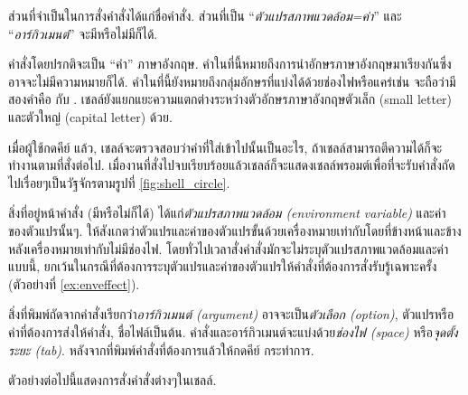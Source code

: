 \begin{thwbr}

ส่วนที่จำเป็นในการสั่งคำสั่งได้แก่ชื่อคำสั่ง. ส่วนที่เป็น ``\textit{ตัวแปรสภาพแวดล้อม=ค่า}'' และ ``\textit{อาร์กิวเมนต์}'' จะมีหรือไม่มีก็ได้. 

คำสั่งโดยปรกติจะเป็น ``คำ'' ภาษาอังกฤษ. คำในที่นี้หมายถึงการนำอักษรภาษาอังกฤษมาเรียงกันซึ่งอาจจะไม่มีความหมายก็ได้. คำในที่นี้ยังหมายถึงกลุ่มอักษรที่แบ่งได้ด้วยช่องไฟหรือแคร่เช่น  จะถือว่ามีสองคำคือ  กับ . เชลล์ยังแยกแยะความแตกต่างระหว่างตัวอักษรภาษาอังกฤษตัวเล็ก (small letter) และตัวใหญ่ (capital letter) ด้วย.

เมื่อผู้ใช้กดคีย์  แล้ว, เชลล์จะตรวจสอบว่าคำที่ใส่เข้าไปนั้นเป็นอะไร, ถ้าเชลล์สามารถตีความได้ก็จะทำงานตามที่สั่งต่อไป. เมื่องานที่สั่งไปจบเรียบร้อยแล้วเชลล์ก็จะแสดงเชลล์พรอมต์เพื่อที่จะรับคำสั่งถัดไปเรื่อยๆเป็นวัฐจักรตามรูปที่ \ref{fig:shell_circle}.

\begin{figure}[!htb]
\end{figure}

สิ่งที่อยู่หน้าคำสั่ง (มีหรือไม่ก็ได้) ได้แก่\emph{ตัวแปรสภาพแวดล้อม (environment variable)} และค่าของตัวแปรนั้นๆ. ให้สังเกตว่าตัวแปรและค่าของตัวแปรขั้นด้วยเครื่องหมายเท่ากับโดยที่ข้างหน้าและข้างหลังเครื่องหมายเท่ากับไม่มีช่องไฟ. โดยทั่วไปเวลาสั่งคำสั่งมักจะไม่ระบุตัวแปรสภาพแวดล้อมและค่าแบบนี้, ยกเว้นในกรณีที่ต้องการระบุตัวแปรและค่าของตัวแปรให้คำสั่งที่ต้องการสั่งรับรู้เฉพาะครั้ง (ตัวอย่างที่ \ref{ex:enveffect}). 

สิ่งที่พิมพ์ถัดจากคำสั่งเรียกว่า\emph{อาร์กิวเมนต์ (argument)} อาจจะเป็น\emph{ตัวเลือก (option)}, ตัวแปรหรือค่าที่ต้องการส่งให้คำสั่ง, ชื่อไฟล์เป็นต้น. คำสั่งและอาร์กิวเมนต์จะแบ่งด้วย\emph{ช่องไฟ (space)} หรือ\emph{จุดตั้งระยะ (tab)}. หลังจากที่พิมพ์คำสั่งที่ต้องการแล้วให้กดคีย์  กระทำการ. 

ตัวอย่างต่อไปนี้แสดงการสั่งคำสั่งต่างๆในเชลล์.%
%



\end{thwbr}
